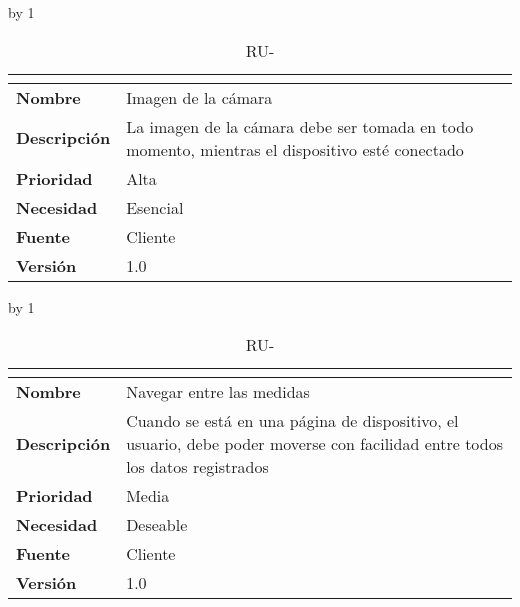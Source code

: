 \advance\ru by 1
\begin{table}[H]
	\caption{RU-\number\ru}
	\begin{tabular}{|l|p{}|}
		\hline
		\multicolumn{2}{|c|}{\cellcolor[HTML]{BFBFBF}{\color[HTML]{000000} \textbf{RU-\number\ru}}} \\ \hline
		\textbf{Nombre}      & Imagen de la cámara                                                                            \\ \hline
		\textbf{Descripción} & La imagen de la cámara debe ser tomada en todo momento, mientras el dispositivo esté conectado \\ \hline
		\textbf{Prioridad}   & Alta                                                                                           \\ \hline
		\textbf{Necesidad}   & Esencial                                                                                       \\ \hline
		\textbf{Fuente}      & Cliente                                                                                        \\ \hline
		\textbf{Versión}     & 1.0                                                                                            \\ \hline
	\end{tabular}
\end{table}
\advance\ru by 1
\begin{table}[H]
	\caption{RU-\number\ru}
	\begin{tabular}{|l|p{}|}
		\hline
		\multicolumn{2}{|c|}{\cellcolor[HTML]{BFBFBF}{\color[HTML]{000000} \textbf{RU-\number\ru}}} \\ \hline
		\textbf{Nombre}      & Navegar entre las medidas                                                                                                   \\ \hline
		\textbf{Descripción} & Cuando se está en una página de dispositivo, el usuario, debe poder moverse con facilidad entre todos los datos registrados \\ \hline
		\textbf{Prioridad}   & Media                                                                                                                       \\ \hline
		\textbf{Necesidad}   & Deseable                                                                                                                    \\ \hline
		\textbf{Fuente}      & Cliente                                                                                                                     \\ \hline
		\textbf{Versión}     & 1.0                                                                                                                         \\ \hline
	\end{tabular}
\end{table}
